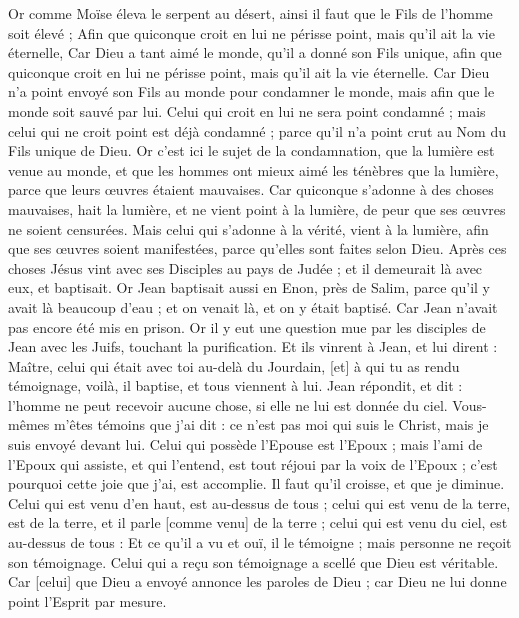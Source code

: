 \begin{multicols}{2}
Or comme Moïse éleva le serpent au désert, ainsi il faut que le Fils de l'homme soit élevé ;
Afin que quiconque croit en lui ne périsse point, mais qu'il ait la vie éternelle,
Car Dieu a tant aimé le monde, qu'il a donné son Fils unique, afin que quiconque croit en lui ne périsse point, mais qu'il ait la vie éternelle.
Car Dieu n'a point envoyé son Fils au monde pour condamner le monde, mais afin que le monde soit sauvé par lui.
Celui qui croit en lui ne sera point condamné ; mais celui qui ne croit point est déjà condamné ; parce qu'il n'a point crut au Nom du Fils unique de Dieu.
Or c'est ici le sujet de la condamnation, que la lumière est venue au monde, et que les hommes ont mieux aimé les ténèbres que la lumière, parce que leurs œuvres étaient mauvaises.
Car quiconque s'adonne à des choses mauvaises, hait la lumière, et ne vient point à la lumière, de peur que ses œuvres ne soient censurées.
Mais celui qui s'adonne à la vérité, vient à la lumière, afin que ses œuvres soient manifestées, parce qu'elles sont faites selon Dieu.
Après ces choses Jésus vint avec ses Disciples au pays de Judée ; et il demeurait là avec eux, et baptisait.
Or Jean baptisait aussi en Enon, près de Salim, parce qu'il y avait là beaucoup d'eau ; et on venait là, et on y était baptisé.
Car Jean n'avait pas encore été mis en prison.
Or il y eut une question mue par les disciples de Jean avec les Juifs, touchant la purification.
Et ils vinrent à Jean, et lui dirent : Maître, celui qui était avec toi au-delà du Jourdain, [et] à qui tu as rendu témoignage, voilà, il baptise, et tous viennent à lui.
Jean répondit, et dit : l'homme ne peut recevoir aucune chose, si elle ne lui est donnée du ciel.
Vous-mêmes m'êtes témoins que j'ai dit : ce n'est pas moi qui suis le Christ, mais je suis envoyé devant lui.
Celui qui possède l'Epouse est l'Epoux ; mais l'ami de l'Epoux qui assiste, et qui l'entend, est tout réjoui par la voix de l'Epoux ; c'est pourquoi cette joie que j'ai, est accomplie.
Il faut qu'il croisse, et que je diminue.
Celui qui est venu d'en haut, est au-dessus de tous ; celui qui est venu de la terre, est de la terre, et il parle [comme venu] de la terre ; celui qui est venu du ciel, est au-dessus de tous :
Et ce qu'il a vu et ouï, il le témoigne ; mais personne ne reçoit son témoignage.
Celui qui a reçu son témoignage a scellé que Dieu est véritable.
Car [celui] que Dieu a envoyé annonce les paroles de Dieu ; car Dieu ne lui donne point l'Esprit par mesure.

\end{multicols}
